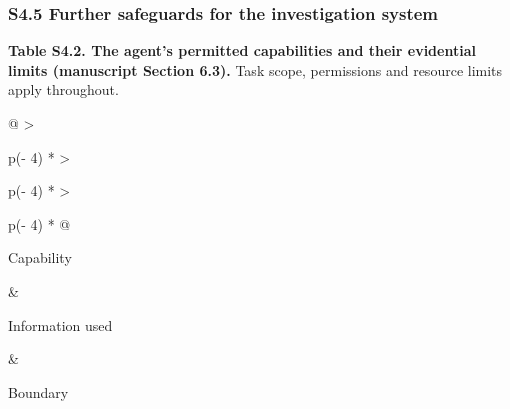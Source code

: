 \documentclass[
  11pt,
]{article}
\begin{document}
\hypertarget{s4.5-further-safeguards-for-the-investigation-system}{%
\subsubsection{S4.5 Further safeguards for the investigation
system}\label{s4.5-further-safeguards-for-the-investigation-system}}

\begin{table}[tp]
\textbf{Table S4.2. The agent's permitted capabilities and their
evidential limits (manuscript Section 6.3).} Task scope, permissions and
resource limits apply throughout.\par\smallskip
{\small
\begin{tabular}{@{}
  >{\raggedright\arraybackslash}p{(\columnwidth - 4\tabcolsep) * }
  >{\raggedright\arraybackslash}p{(\columnwidth - 4\tabcolsep) * }
  >{\raggedright\arraybackslash}p{(\columnwidth - 4\tabcolsep) * }@{}}
\toprule\noalign{}
\begin{minipage}[b]{\linewidth}\raggedright
Capability
\end{minipage} & \begin{minipage}[b]{\linewidth}\raggedright
Information used
\end{minipage} & \begin{minipage}[b]{\linewidth}\raggedright
Boundary
\end{minipage} \\
\midrule\noalign{}


\end{tabular}}
\end{table}
\end{document}
